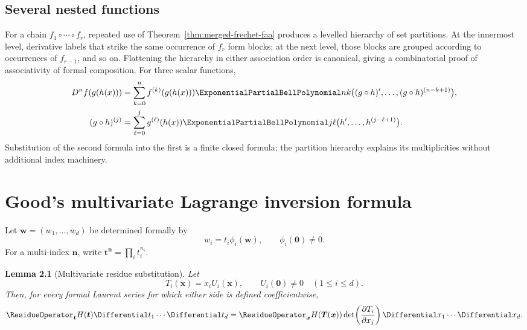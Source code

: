 \documentclass[11pt,a4paper,oneside,openany]{book}
\newtheorem{lemma}[theorem]{Lemma}
\theoremstyle{definition}
\theoremstyle{remark}
\begin{document}
\section{Several nested functions}

For a chain $f_1\circ\cdots\circ f_r$, repeated use of
Theorem~\ref{thm:merged-frechet-faa} produces a levelled hierarchy of set
partitions.  At the innermost level, derivative labels that strike the same
occurrence of $f_r$ form blocks; at the next level, those blocks are grouped
according to occurrences of $f_{r-1}$, and so on.  Flattening the hierarchy in
either association order is canonical, giving a combinatorial proof of
associativity of formal composition.  For three scalar functions,
\begin{align}
 D^n f(g(h(x)))
 &=\sum_{k=0}^{n}f^{(k)}(g(h(x)))
   \ExponentialPartialBellPolynomial nk\bigl((g\circ h)',\ldots,(g\circ h)^{(n-k+1)}\bigr),    \label{eq:merged-three-composition}\\
 (g\circ h)^{(j)}
 &=\sum_{\ell=0}^{j}g^{(\ell)}(h(x))
   \ExponentialPartialBellPolynomial j\ell\bigl(h',\ldots,h^{(j-\ell+1)}\bigr).              \label{eq:merged-three-composition-inner}
\end{align}
Substitution of the second formula into the first is a finite closed formula;
the partition hierarchy explains its multiplicities without additional index
machinery.

\chapter{Good's multivariate Lagrange inversion formula}
\label{ch:merged-good}

Let $\bm w=(w_1,\ldots,w_d)$ be determined formally by
\begin{equation}
 w_i=t_i\phi_i(\bm w),\qquad \phi_i(\bm0)\ne0.                     \label{eq:merged-good-system}
\end{equation}
For a multi-index $\bm n$, write
$\bm t^{\bm n}=\prod_it_i^{n_i}$.

\begin{lemma}[Multivariate residue substitution]
\label{lem:merged-multiresidue}
Let
\[
 T_i(\bm x)=x_iU_i(\bm x),\qquad U_i(\bm0)\ne0\quad(1\leq i\leq d).
\]
Then, for every formal Laurent series for which either side is defined
coefficientwise,
\begin{equation}
 \ResidueOperator_{\bm t}H(\bm t)\Differential t_1\cdots\Differential t_d
 =\ResidueOperator_{\bm x}H(\bm T(\bm x))
   \det\!\left(\frac{\partial T_i}{\partial x_j}\right)
   \Differential x_1\cdots\Differential x_d.                                          \label{eq:merged-multiresidue}
\end{equation}
\end{lemma}
\end{document}
